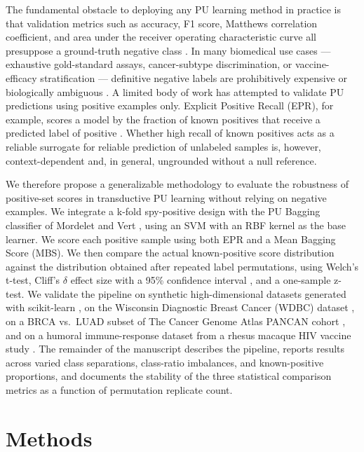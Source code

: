 \documentclass[11pt]{article}
\begin{document}
The fundamental obstacle to deploying any PU learning method in practice is that validation metrics such as accuracy, F1 score, Matthews correlation coefficient, and area under the receiver operating characteristic curve all presuppose a ground-truth negative class \cite{hanley1982auc}. In many biomedical use cases --- exhaustive gold-standard assays, cancer-subtype discrimination, or vaccine-efficacy stratification --- definitive negative labels are prohibitively expensive or biologically ambiguous \cite{yang2014epu,wang2019nsemda}. A limited body of work has attempted to validate PU predictions using positive examples only. Explicit Positive Recall (EPR), for example, scores a model by the fraction of known positives that receive a predicted label of positive \cite{cheng2015epr}. Whether high recall of known positives acts as a reliable surrogate for reliable prediction of unlabeled samples is, however, context-dependent and, in general, ungrounded without a null reference.

We therefore propose a generalizable methodology to evaluate the robustness of positive-set scores in transductive PU learning without relying on negative examples. We integrate a k-fold spy-positive design \cite{liu2003spy} with the PU Bagging classifier of Mordelet and Vert \cite{mordelet2014bagging}, using an SVM with an RBF kernel \cite{pedregosa2011scikit} as the base learner. We score each positive sample using both EPR \cite{cheng2015epr} and a Mean Bagging Score (MBS). We then compare the actual known-positive score distribution against the distribution obtained after repeated label permutations, using Welch's t-test, Cliff's $\delta$ effect size with a 95\% confidence interval \cite{cliff1993dominance}, and a one-sample z-test. We validate the pipeline on synthetic high-dimensional datasets generated with scikit-learn \cite{pedregosa2011scikit,abraham2014scikit}, on the Wisconsin Diagnostic Breast Cancer (WDBC) dataset \cite{wolberg1999nuclear,wolberg2002computer}, on a BRCA vs.\ LUAD subset of The Cancer Genome Atlas PANCAN cohort \cite{weinstein2013tcga}, and on a humoral immune-response dataset from a rhesus macaque HIV vaccine study \cite{lakhashe2022virosomal,marasini2021enshivig,malherbe2021adenovirus}. The remainder of the manuscript describes the pipeline, reports results across varied class separations, class-ratio imbalances, and known-positive proportions, and documents the stability of the three statistical comparison metrics as a function of permutation replicate count.

\section{Methods}
\end{document}
